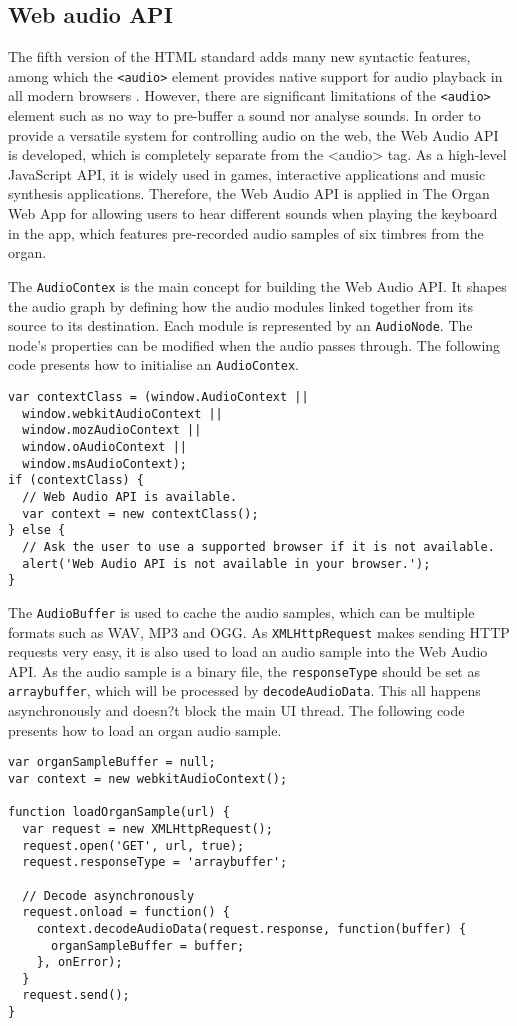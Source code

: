 \subsection{Web audio API}
The fifth version of the HTML standard adds many new syntactic features, among which the \verb|<audio>| element provides native support for audio playback in all modern browsers \cite{smus2013web}. However, there are significant limitations of the \verb|<audio>| element such as no way to pre-buffer a sound nor analyse sounds. In order to provide a versatile system for controlling audio on the web, the Web Audio API is developed, which is completely separate from the <audio> tag. As a high-level JavaScript API, it is widely used in games, interactive applications and music synthesis applications. Therefore, the Web Audio API is applied in The Organ Web App for allowing users to hear different sounds when playing the keyboard in the app, which features pre-recorded audio samples of six timbres from the organ.

The \verb|AudioContex| is the main concept for building the Web Audio API. It shapes the audio graph by defining how the audio modules linked together from its source to its destination. Each module is represented by an \verb|AudioNode|. The node's properties can be modified when the audio passes through. The following code presents how to initialise an \verb|AudioContex|.
\begin{verbatim}
var contextClass = (window.AudioContext || 
  window.webkitAudioContext || 
  window.mozAudioContext || 
  window.oAudioContext || 
  window.msAudioContext);
if (contextClass) {
  // Web Audio API is available.
  var context = new contextClass();
} else {
  // Ask the user to use a supported browser if it is not available.
  alert('Web Audio API is not available in your browser.');
}
\end{verbatim}

The \verb|AudioBuffer| is used to cache the audio samples, which can be multiple formats such as WAV, MP3 and OGG. As \verb|XMLHttpRequest| makes sending HTTP requests very easy, it is also used to load an audio sample into the Web Audio API. As the audio sample is a binary file, the \verb|responseType| should be set as \verb|arraybuffer|, which will be processed by \verb|decodeAudioData|. This all happens asynchronously and doesn?t block the main UI thread. The following code presents how to load an organ audio sample.
\begin{verbatim}
var organSampleBuffer = null;
var context = new webkitAudioContext();
 
function loadOrganSample(url) {
  var request = new XMLHttpRequest();
  request.open('GET', url, true);
  request.responseType = 'arraybuffer';
 
  // Decode asynchronously
  request.onload = function() {
    context.decodeAudioData(request.response, function(buffer) {
      organSampleBuffer = buffer;
    }, onError);
  }
  request.send();
}
\end{verbatim}

